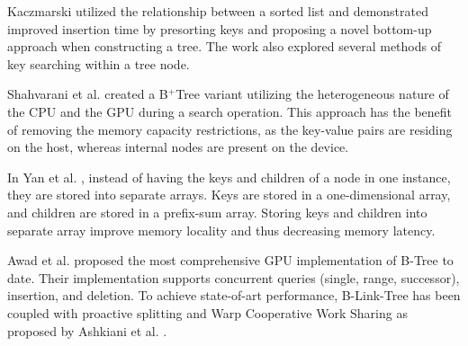 Kaczmarski \cite{kaczmarski} utilized the relationship between a sorted list and demonstrated improved insertion time by presorting keys and proposing a novel bottom-up approach when constructing a tree. The work also explored several methods of key searching within a tree node.

Shahvarani et al. \cite{hb+tree} created a B$^+$Tree variant utilizing the heterogeneous nature of the CPU and the GPU during a search operation. This approach has the benefit of removing the memory capacity restrictions, as the key-value pairs are residing on the host, whereas internal nodes are present on the device.

In Yan et al. \cite{harmonia}, instead of having the keys and children of a node in one instance, they are stored into separate arrays. Keys are stored in a one-dimensional array, and children are stored in a prefix-sum array. Storing keys and children into separate array improve memory locality and thus decreasing memory latency.

Awad et al. \cite{awad} proposed the most comprehensive GPU implementation of B-Tree to date. Their implementation supports concurrent queries (single, range, successor), insertion, and deletion. To achieve state-of-art performance, B-Link-Tree has been coupled with proactive splitting and Warp Cooperative Work Sharing as proposed by Ashkiani et al. \cite{ashkiani2018dynamic}.

